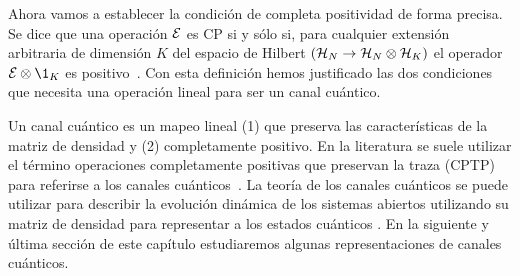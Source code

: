 Ahora vamos a establecer la condición de completa positividad 
de forma precisa. Se dice que una operación $\mathcal{E}$ es CP si 
y sólo si, para cualquier extensión arbitraria de dimensión $K$ 
del espacio de Hilbert $(\mathcal{H}_N \rightarrow \mathcal{H}_N \otimes \mathcal{H}_K)$ 
el operador $\E\otimes\1_K$ es positivo~\cite{bengtsson_zyczkowski_2017}. 
Con esta definición hemos justificado las dos condiciones que 
necesita una operación lineal para ser un canal cuántico.

Un canal cuántico es un mapeo lineal  (1) que preserva las características
de la matriz de densidad y (2) completamente positivo. 
En la literatura se suele utilizar el término operaciones 
completamente positivas que preservan la traza 
(CPTP) para referirse a los canales 
cuánticos~\cite{bengtsson_zyczkowski_2017}. 
La teoría de los canales cuánticos se puede utilizar para 
describir la evolución dinámica de los sistemas abiertos 
utilizando su matriz de densidad para representar a los estados cuánticos
 .
En la siguiente y última sección de este capítulo estudiaremos 
algunas representaciones de canales cuánticos. 


%
%
%

